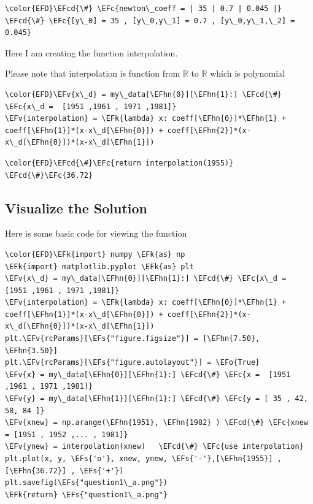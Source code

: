 \documentclass[11pt]{article}
\newcommand{\EFc}[1]{\textcolor{EFc}{#1}} %
\newcommand{\EFcd}[1]{\textcolor{EFcd}{#1}} %
\newcommand{\EFs}[1]{\textcolor{EFs}{#1}} %
\newcommand{\EFk}[1]{\textcolor{EFk}{#1}} %
\newcommand{\EFv}[1]{\textcolor{EFv}{#1}} %
\newcommand{\EFo}[1]{\textcolor{EFo}{#1}} %
\newcommand{\EFhn}[1]{\textcolor{EFhn}{#1}} %
\begin{document}
\begin{Code}
\begin{Verbatim}
\color{EFD}\EFcd{\#} \EFc{newton\_coeff = | 35 | 0.7 | 0.045 |}
\EFcd{\#} \EFc{[y\_0] = 35 , [y\_0,y\_1] = 0.7 , [y\_0,y\_1,\_2] = 0.045}
\end{Verbatim}
\end{Code}
Here I am creating the function interpolation.

Please note that interpolation is function from \(\mathbb{R}\) to \(\mathbb{R}\) which is polynomial

\begin{Code}
\begin{Verbatim}
\color{EFD}\EFv{x\_d} = my\_data[\EFhn{0}][\EFhn{1}:] \EFcd{\#} \EFc{x\_d =  [1951 ,1961 , 1971 ,1981]}
\EFv{interpolation} = \EFk{lambda} x: coeff[\EFhn{0}]*\EFhn{1} + coeff[\EFhn{1}]*(x-x\_d[\EFhn{0}]) + coeff[\EFhn{2}]*(x-x\_d[\EFhn{0}])*(x-x\_d[\EFhn{1}])
\end{Verbatim}
\end{Code}

\begin{Code}
\begin{Verbatim}
\color{EFD}\EFcd{\#}\EFc{return interpolation(1955)}
\EFcd{\#}\EFc{36.72}
\end{Verbatim}
\end{Code}
\subsection{Visualize the Solution}
\label{sec:orgc44e17c}
Here is some basic code for viewing the function

\begin{Code}
\begin{Verbatim}
\color{EFD}\EFk{import} numpy \EFk{as} np
\EFk{import} matplotlib.pyplot \EFk{as} plt
\EFv{x\_d} = my\_data[\EFhn{0}][\EFhn{1}:] \EFcd{\#} \EFc{x\_d =  [1951 ,1961 , 1971 ,1981]}
\EFv{interpolation} = \EFk{lambda} x: coeff[\EFhn{0}]*\EFhn{1} + coeff[\EFhn{1}]*(x-x\_d[\EFhn{0}]) + coeff[\EFhn{2}]*(x-x\_d[\EFhn{0}])*(x-x\_d[\EFhn{1}])
plt.\EFv{rcParams}[\EFs{"figure.figsize"}] = [\EFhn{7.50}, \EFhn{3.50}]
plt.\EFv{rcParams}[\EFs{"figure.autolayout"}] = \EFo{True}
\EFv{x} = my\_data[\EFhn{0}][\EFhn{1}:] \EFcd{\#} \EFc{x =  [1951 ,1961 , 1971 ,1981]}
\EFv{y} = my\_data[\EFhn{1}][\EFhn{1}:] \EFcd{\#} \EFc{y = [ 35 , 42, 58, 84 ]}
\EFv{xnew} = np.arange(\EFhn{1951}, \EFhn{1982} ) \EFcd{\#} \EFc{xnew = [1951 , 1952 ,... , 1981]}
\EFv{ynew} = interpolation(xnew)   \EFcd{\#} \EFc{use interpolation}
plt.plot(x, y, \EFs{'o'}, xnew, ynew, \EFs{'-'},[\EFhn{1955}] ,[\EFhn{36.72}] , \EFs{'+'})
plt.savefig(\EFs{"question1\_a.png"})
\EFk{return} \EFs{"question1\_a.png"}
\end{Verbatim}
\end{Code}
\end{document}
